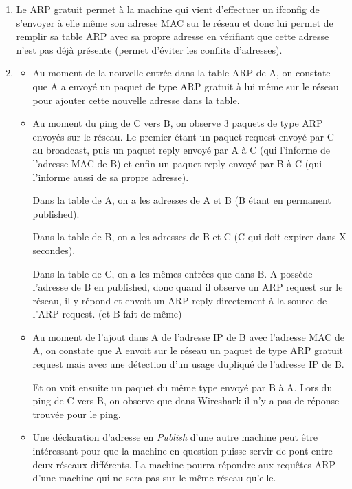 \documentclass{article}
\begin{document}
\begin{enumerate}[label=\arabic*)]
\begin{itemize}
	\end{itemize}
	
	\item Le ARP gratuit permet à la machine qui vient d'effectuer un ifconfig de s'envoyer à elle même son adresse MAC sur le réseau et donc lui permet de remplir sa table ARP avec sa propre adresse en vérifiant que cette adresse n'est pas déjà présente (permet d'éviter les conflits d'adresses).

	\item
	\begin{itemize}\renewcommand{\labelitemi}{$\bullet$}
		\item Au moment de la nouvelle entrée dans la table ARP de A, on constate que A a envoyé un paquet de type ARP gratuit à lui même sur le réseau pour ajouter cette nouvelle adresse dans la table.

		\item Au moment du ping de C vers B, on observe 3 paquets de type ARP envoyés sur le réseau. Le premier étant un paquet request envoyé par C au broadcast, puis un paquet reply envoyé par A à C (qui l'informe de l'adresse MAC de B) et enfin un paquet reply envoyé par B à C (qui l'informe aussi de sa propre adresse). 

Dans la table de A, on a les adresses de A et B (B étant en permanent published).

Dans la table de B, on a les adresses de B et C (C qui doit expirer dans X secondes).

Dans la table  de C, on a les mêmes entrées que dans B. A possède l'adresse de B en published, donc quand il observe un ARP request sur le réseau, il y répond et envoit un ARP reply directement à la source de l'ARP request. (et B fait de même)

		\item Au moment de l'ajout dans A de l'adresse IP de B avec l'adresse MAC de A, on constate que A envoit sur le réseau un paquet de type ARP gratuit request mais avec une détection d'un usage dupliqué de l'adresse IP de B. 

Et on voit ensuite un paquet du même type envoyé par B à A. Lors du ping de C vers B, on observe que dans Wireshark il n'y a pas de réponse trouvée pour le ping.
		\item Une déclaration d'adresse en \textit{Publish} d'une autre machine peut être intéressant pour que la machine en question puisse servir de pont entre deux réseaux différents. La machine pourra répondre aux requêtes ARP d'une machine qui ne sera pas sur le même réseau qu'elle.
	\end{itemize}


\end{enumerate}
\end{document}
